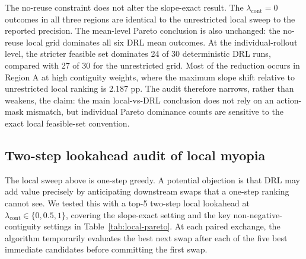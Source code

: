 \documentclass[]{interact}
\theoremstyle{plain}
\begin{document}
The no-reuse constraint does not alter the slope-exact result. The $\lambda_{\mathrm{cont}}=0$ outcomes in all three regions are identical to the unrestricted local sweep to the reported precision. The mean-level Pareto conclusion is also unchanged: the no-reuse local grid dominates all six DRL mean outcomes. At the individual-rollout level, the stricter feasible set dominates 24 of 30 deterministic DRL runs, compared with 27 of 30 for the unrestricted grid. Most of the reduction occurs in Region A at high contiguity weights, where the maximum slope shift relative to unrestricted local ranking is 2.187 pp. The audit therefore narrows, rather than weakens, the claim: the main local-vs-DRL conclusion does not rely on an action-mask mismatch, but individual Pareto dominance counts are sensitive to the exact local feasible-set convention.

\subsection{Two-step lookahead audit of local myopia}\label{sec:results-lookahead}

The local sweep above is one-step greedy. A potential objection is that DRL may add value precisely by anticipating downstream swaps that a one-step ranking cannot see. We tested this with a top-5 two-step local lookahead at $\lambda_{\mathrm{cont}}\in\{0,0.5,1\}$, covering the slope-exact setting and the key non-negative-contiguity settings in Table~\ref{tab:local-pareto}. At each paired exchange, the algorithm temporarily evaluates the best next swap after each of the five best immediate candidates before committing the first swap.
\end{document}
